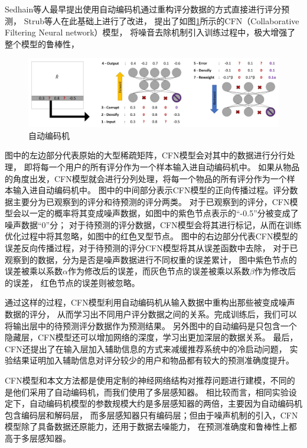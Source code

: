 Sedhain等人\parencite{sedhain2015autorec}最早提出使用自动编码机通过重构评分数据的方式直接进行评分预测，
Strub等人\parencite{strub2016hybrid}在此基础上进行了改进，
提出了如图\ref{fig:ae}所示的CFN（Collaborative Filtering Neural network）模型，
将噪音去除机制引入训练过程中，极大增强了整个模型的鲁棒性，

\begin{figure}[htbp]
\centering
\includegraphics[scale=0.22]{images/ae.jpeg}
\caption{自动编码机}
\label{fig:ae}
\end{figure}

图中的左边部分代表原始的大型稀疏矩阵，CFN模型会对其中的数据进行分行处理，
即将每一个用户的所有评分作为一个样本输入进自动编码机中。
如果从物品的角度出发，CFN模型就会进行分列处理，将每一个物品的所有评分作为一个样本输入进自动编码机中。
图中的中间部分表示CFN模型的正向传播过程。评分数据主要分为已观察到的评分和待预测的评分两类。
对于已观察到的评分，CFN模型会以一定的概率将其变成噪声数据，如图中的紫色节点表示的``-0.5''分被变成了噪声数据``0''分；
对于待预测的评分数据，CFN模型会将其进行标记，从而在训练优化过程中将其忽略，如图中的红色叉型节点。
图中的右边部分代表CFN模型的误差反向传播过程，对于待预测的评分CFN模型将其从误差函数中去除，
对于已观察到的数据，分为是否是噪声数据进行不同权重的误差累计，
图中紫色节点的误差被乘以系数$\alpha$作为修改后的误差，而灰色节点的误差被乘以系数$\beta$作为修改后的误差，
红色节点的误差则被忽略。

通过这样的过程，CFN模型利用自动编码机从输入数据中重构出那些被变成噪声数据的评分，
从而学习出不同用户评分数据之间的关系。完成训练后，我们可以将输出层中的待预测评分数据作为预测结果。
另外图中的自动编码是只包含一个隐藏层，CFN模型还可以增加网络的深度，学习出更加深层的数据关系。
最后，CFN还提出了在输入层加入辅助信息的方式来减缓推荐系统中的冷启动问题，
实验结果证明加入辅助信息对评分较少的用户和物品都有较大的预测准确度提升。

CFN模型和本文方法都是使用定制的神经网络结构对推荐问题进行建模，不同的是他们采用了自动编码机，而我们使用了多层感知器。
相比较而言，相同实验设定下，自动编码机模型的参数规模大约是多层感知器的两倍，主要因为自动编码机包含编码层和解码层，
而多层感知器只有编码层；但由于噪声机制的引入，CFN模型除了具备数据还原能力，还用于数据去噪能力，
在预测准确度和鲁棒性上都高于多层感知器。

